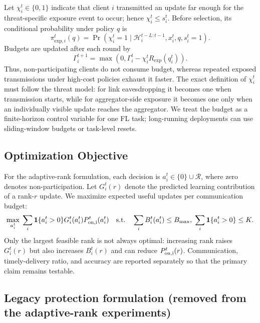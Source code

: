 \documentclass[preprint,12pt]{elsarticle}
\begin{document}
Let $\chi_i^t\in\{0,1\}$ indicate that client $i$ transmitted an update far enough for the threat-specific exposure event to occur; hence $\chi_i^t\leq s_i^t$. Before selection, its conditional probability under policy $q$ is
\begin{equation}
	\pi_{\mathrm{exp},i}^t(q)=
	\Pr\!\left(\chi_i^t=1\mid \mathcal H_i^{t-L:t-1},x_i^t,q,s_i^t=1\right).
	\label{eq:exposure_probability}
\end{equation}
Budgets are updated after each round by
\begin{equation}
	\Gamma_i^{t+1}
	=
	\max\left(0,\Gamma_i^t - \chi_i^t R_{\mathrm{exp}}(q_i^t)\right).
	\label{eq:budget_update}
\end{equation}
Thus, non-participating clients do not consume budget, whereas repeated exposed transmissions under high-cost policies exhaust it faster. The exact definition of $\chi_i^t$ must follow the threat model: for link eavesdropping it becomes one when transmission starts, while for aggregator-side exposure it becomes one only when an individually visible update reaches the aggregator. We treat the budget as a finite-horizon control variable for one FL task; long-running deployments can use sliding-window budgets or task-level resets.

\subsection{Optimization Objective}
For the adaptive-rank formulation, each decision is $a_i^t\in\{0\}\cup\mathcal R$, where zero denotes non-participation. Let $G_i^t(r)$ denote the predicted learning contribution of a rank-$r$ update. We maximize expected useful updates per communication budget:
\begin{equation}
\max_{a_i^t}\;\sum_i \mathbf 1\{a_i^t>0\}G_i^t(a_i^t)P_{\rm on,i}^t(a_i^t)
\quad\text{s.t.}\quad \sum_i B_i^t(a_i^t)\le B_{\max},\;\sum_i\mathbf 1\{a_i^t>0\}\le K.
\label{eq:lora_objective}
\end{equation}
Only the largest feasible rank is not always optimal: increasing rank raises $G_i^t(r)$ but also increases $B_i^t(r)$ and can reduce $P_{\rm on,i}^t(r)$. Communication, timely-delivery ratio, and accuracy are reported separately so that the primary claim remains testable.

\subsection{Legacy protection formulation (removed from the adaptive-rank experiments)}
\end{document}
